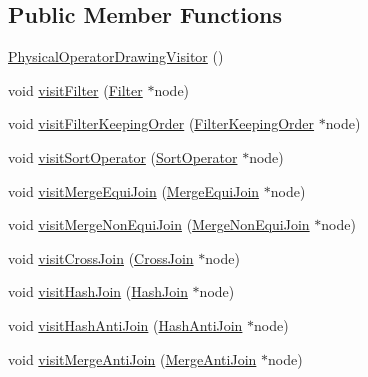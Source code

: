 \subsection*{Public Member Functions}
\begin{DoxyCompactItemize}
\item 
\hyperlink{classrafe_1_1_physical_operator_drawing_visitor_a96e750b0d2c319d48c826843d67c9922}{Physical\+Operator\+Drawing\+Visitor} ()
\item 
void \hyperlink{classrafe_1_1_physical_operator_drawing_visitor_a8c34db1b84ad6fb8c8de4b5a27542062}{visit\+Filter} (\hyperlink{classrafe_1_1_filter}{Filter} $\ast$node)
\item 
void \hyperlink{classrafe_1_1_physical_operator_drawing_visitor_ad354fa6a9a6b139e893e4827ff2ecf3d}{visit\+Filter\+Keeping\+Order} (\hyperlink{classrafe_1_1_filter_keeping_order}{Filter\+Keeping\+Order} $\ast$node)
\item 
void \hyperlink{classrafe_1_1_physical_operator_drawing_visitor_a1d9f4efce36cd996b4d969e12f926560}{visit\+Sort\+Operator} (\hyperlink{classrafe_1_1_sort_operator}{Sort\+Operator} $\ast$node)
\item 
void \hyperlink{classrafe_1_1_physical_operator_drawing_visitor_aaa61a390184345f77b3d7d731f5eb042}{visit\+Merge\+Equi\+Join} (\hyperlink{classrafe_1_1_merge_equi_join}{Merge\+Equi\+Join} $\ast$node)
\item 
void \hyperlink{classrafe_1_1_physical_operator_drawing_visitor_ade0f29c6899eddf9fca59013eb079ac3}{visit\+Merge\+Non\+Equi\+Join} (\hyperlink{classrafe_1_1_merge_non_equi_join}{Merge\+Non\+Equi\+Join} $\ast$node)
\item 
void \hyperlink{classrafe_1_1_physical_operator_drawing_visitor_ae10d5b2b254263a0a206ba8056799746}{visit\+Cross\+Join} (\hyperlink{classrafe_1_1_cross_join}{Cross\+Join} $\ast$node)
\item 
void \hyperlink{classrafe_1_1_physical_operator_drawing_visitor_ac4be6a3ffbb85fd1d7a7f5ec109277ca}{visit\+Hash\+Join} (\hyperlink{classrafe_1_1_hash_join}{Hash\+Join} $\ast$node)
\item 
void \hyperlink{classrafe_1_1_physical_operator_drawing_visitor_aaff4651c152fd3d86805014459f5f565}{visit\+Hash\+Anti\+Join} (\hyperlink{classrafe_1_1_hash_anti_join}{Hash\+Anti\+Join} $\ast$node)
\item 
void \hyperlink{classrafe_1_1_physical_operator_drawing_visitor_a048897346f3a1344cab951f3d3ef7394}{visit\+Merge\+Anti\+Join} (\hyperlink{classrafe_1_1_merge_anti_join}{Merge\+Anti\+Join} $\ast$node)

\end{DoxyCompactItemize}
